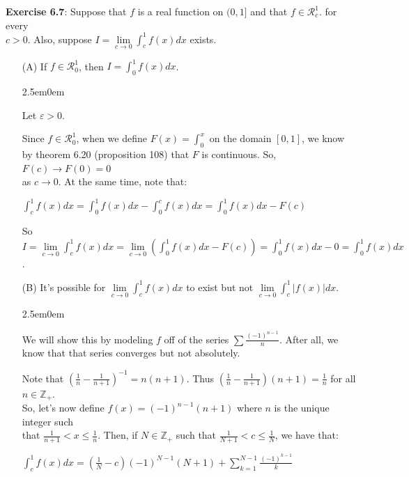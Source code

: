 \documentclass{book}
\newcommand{\pracTwo}{
   \color{Orange}%
   \fontsize{12}{14}\selectfont%
}
\newenvironment{myIndent}{%
   \begin{adjustwidth}{2.5em}{0em}%
}{%
   \end{adjustwidth}%
}
\newcommand{\retTwo}{\hfill\bigbreak}
\begin{document}
\textbf{Exercise 6.7}: Suppose that $f$ is a real function on $(0, 1]$ and that $f \in \mathscr{R}_c^1$. for every\\ $c > 0$. Also, suppose $I = \lim\limits_{c\rightarrow 0}\int_c^1 f(x)dx$ exists.
\begin{itemize}
   \item[(A)] If $f \in \mathscr{R}_0^1$, then $I = \int_0^1f(x)dx$.
   
   {\begin{myIndent}\pracTwo
      Let $\varepsilon > 0$.\retTwo

      Since $f \in \mathscr{R}_0^1$, when we define $F(x) = \int_0^x$ on the domain $[0, 1]$, we know\\ by theorem 6.20 (proposition 108) that $F$ is continuous. So, $F(c) \rightarrow F(0) = 0$\\ as $c \rightarrow 0$. At the same time, note that:

      {\centering $\int_c^1f(x)dx = \int_0^1f(x)dx - \int_0^cf(x)dx = \int_0^1f(x)dx - F(c)$ \retTwo\par}

      So $I = \lim\limits_{c\rightarrow 0}\int_c^1 f(x)dx = \lim\limits_{c\rightarrow 0}\left(\int_0^1 f(x)dx - F(c)\right) = \int_0^1 f(x)dx - 0 = \int_0^1 f(x)dx$.\retTwo
   \end{myIndent}}

   \item[(B)] It's possible for $\lim\limits_{c\rightarrow 0}\int_c^1 f(x)dx$ to exist but not $\lim\limits_{c\rightarrow 0}\int_c^1 |f(x)|dx$.
   
   {\begin{myIndent}\pracTwo
      We will show this by modeling $f$ off of the series $\sum\frac{(-1)^{n-1}}{n}$. After all, we\\ know that that series converges but not absolutely.\retTwo

      Note that $\left(\frac{1}{n} - \frac{1}{n+1}\right)^{-1} = n(n+1)$. Thus $\left(\frac{1}{n} - \frac{1}{n+1}\right)(n+1) = \frac{1}{n}$ for all $n \in \mathbb{Z}_+$.\\ So, let's now define $f(x) = (-1)^{n-1}(n+1)$ where $n$ is the unique integer such\\ that $\frac{1}{n+1} < x \leq \frac{1}{n}$. Then, if $N \in \mathbb{Z}_+$ such that $\frac{1}{N+1} < c \leq \frac{1}{N}$, we have that:

      {\centering $\int_c^1f(x)dx = (\frac{1}{N} - c)(-1)^{N-1}(N+1) + \sum\limits_{k=1}^{N-1}\frac{(-1)^{k-1}}{k}$ \retTwo\par}


\end{myIndent}}
\end{itemize}
\end{document}
